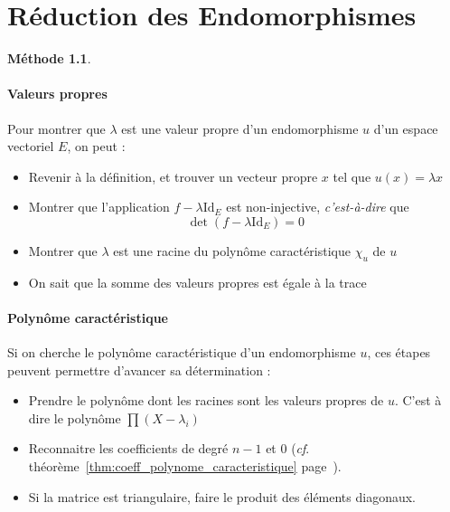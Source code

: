 \documentclass[11pt,a4paper]{report}
\theoremstyle{definition}
\newtheorem{methode}[theorem]{Méthode}
\begin{document}
\chapter{Réduction des Endomorphismes}
\begin{methode}
     \subsubsection*{Valeurs propres}
     Pour montrer que $\lambda$ est une valeur propre d'un endomorphisme $u$ d'un espace vectoriel $E$, on peut : 
     \begin{itemize}
         \item Revenir à la définition, et trouver un vecteur propre $x$ tel que $u(x) = \lambda x$
         \item Montrer que l'application $f - \lambda \mathrm{Id}_E$ est non-injective, \emph{c'est-à-dire} que \[\det (f - \lambda \mathrm{Id}_E) = 0\]
         \item Montrer que $\lambda$ est une racine du polynôme caractéristique $\chi_u$ de $u$
         \item On sait que la somme des valeurs propres est égale à la trace
     \end{itemize}
     \subsubsection*{Polynôme caractéristique}
     Si on cherche le polynôme caractéristique d'un endomorphisme $u$, ces étapes peuvent permettre d'avancer sa détermination :
     \begin{itemize}
         \item Prendre le polynôme dont les racines sont les valeurs propres de $u$. C'est à dire le polynôme $\prod (X - \lambda_i)$
         \item Reconnaitre les coefficients de degré $n-1$ et $0$ (\textit{cf}. théorème~\ref{thm:coeff_polynome_caracteristique} page~\pageref{thm:coeff_polynome_caracteristique}).
         \item Si la matrice est triangulaire, faire le produit des éléments diagonaux.
     \end{itemize}

\end{methode}
\end{document}
